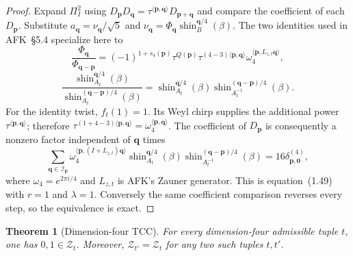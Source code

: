 \documentclass[11pt]{article}
\newtheorem{theorem}{Theorem}
\begin{document}
\begin{proof}
Expand $\Pi_I^2$ using
$D_{\boldsymbol p}D_{\boldsymbol q}
=\tau^{\langle\boldsymbol p,\boldsymbol q\rangle}
D_{\boldsymbol p+\boldsymbol q}$ and compare the coefficient of each
$D_{\boldsymbol p}$.  Substitute
$a_{\boldsymbol q}=\nu_{\boldsymbol q}/\sqrt5$ and
$\nu_{\boldsymbol q}
=\Phi_{\boldsymbol q}\operatorname{shin}_{B}^{\boldsymbol q/4}(\beta)$.
The two identities used in AFK~\S5.4 specialize here to
\[
 \frac{\Phi_{\boldsymbol q}}{\Phi_{\boldsymbol q-\boldsymbol p}}
 =(-1)^{1+s_4(\boldsymbol p)}\tau^{Q(\boldsymbol p)}
   \tau^{(4-3)\langle\boldsymbol p,\boldsymbol q\rangle}
   \omega_4^{\langle\boldsymbol p,L_{z,t}\boldsymbol q\rangle},
\]
\[
 \frac{\operatorname{shin}_{A_t}^{\boldsymbol q/4}(\beta)}
 {\operatorname{shin}_{A_t}^{(\boldsymbol q-\boldsymbol p)/4}(\beta)}
 =
 \operatorname{shin}_{A_t}^{\boldsymbol q/4}(\beta)
 \operatorname{shin}_{A_t^{-1}}^{(\boldsymbol q-\boldsymbol p)/4}(\beta).
\]
For the identity twist, $f_t(1)=1$.  Its Weyl chirp supplies the
additional power $\tau^{\langle\boldsymbol p,\boldsymbol q\rangle}$;
therefore
$\tau^{(1+4-3)\langle\boldsymbol p,\boldsymbol q\rangle}
=\omega_4^{\langle\boldsymbol p,\boldsymbol q\rangle}$.
The coefficient of $D_{\boldsymbol p}$ is consequently a nonzero
factor independent of $\boldsymbol q$ times
\[
 \sum_{\boldsymbol q\in\mathcal I_{\boldsymbol p}}
 \omega_4^{\langle\boldsymbol p,(I+L_{z,t})\boldsymbol q\rangle}
 \operatorname{shin}_{A_t}^{\boldsymbol q/4}(\beta)
 \operatorname{shin}_{A_t^{-1}}^{(\boldsymbol q-\boldsymbol p)/4}(\beta)
 =16\delta^{(4)}_{\boldsymbol p,\boldsymbol0},
\]
where $\omega_4=e^{2\pi i/4}$ and $L_{z,t}$ is AFK's Zauner
generator.  This is equation~(1.49) with $r=1$ and $\lambda=1$.
Conversely the same coefficient comparison reverses every step, so
the equivalence is exact.
\end{proof}

\begin{theorem}[Dimension-four TCC]\label{thm:shifts}
For every dimension-four admissible tuple $t$, one has
$0,1\in\mathcal Z_t$.  Moreover,
$\mathcal Z_{t'}=\mathcal Z_t$ for any two such tuples $t,t'$.
\end{theorem}
\end{document}
